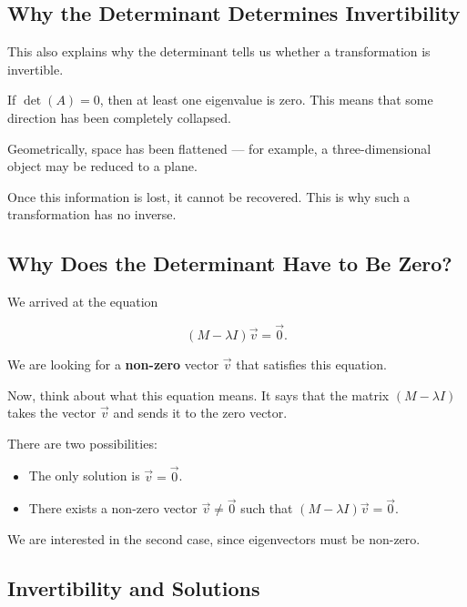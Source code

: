 \documentclass[11pt,openany]{book}
\theoremstyle{definition}
\begin{document}
\subsection{Why the Determinant Determines Invertibility}

This also explains why the determinant tells us whether a transformation is invertible.

\medskip

If $\det(A) = 0$, then at least one eigenvalue is zero. This means that some direction 
has been completely collapsed.

\medskip

Geometrically, space has been flattened — for example, a three-dimensional object may be 
reduced to a plane.

\medskip

Once this information is lost, it cannot be recovered. This is why such a transformation 
has no inverse.

\subsection{Why Does the Determinant Have to Be Zero?}

We arrived at the equation

\[
(M - \lambda I)\vec{v} = \vec{0}.
\]

We are looking for a \textbf{non-zero} vector $\vec{v}$ that satisfies this equation.

\medskip

Now, think about what this equation means. It says that the matrix $(M - \lambda I)$ 
takes the vector $\vec{v}$ and sends it to the zero vector.

\medskip

There are two possibilities:

\begin{itemize}
  \item The only solution is $\vec{v} = \vec{0}$.
  \item There exists a non-zero vector $\vec{v} \neq \vec{0}$ such that $(M - \lambda I)\vec{v} = \vec{0}$.
\end{itemize}

\medskip

We are interested in the second case, since eigenvectors must be non-zero.

\medskip

\subsection{Invertibility and Solutions}
\end{document}

